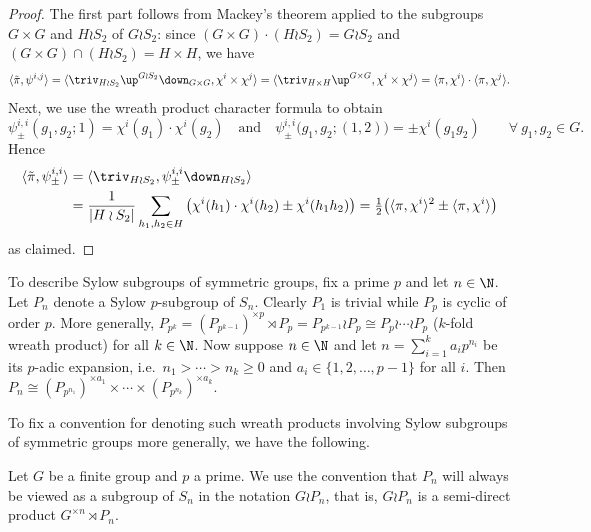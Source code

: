 \begin{proof}
	The first part follows from Mackey's theorem applied to the subgroups $G\times G$ and $H\wr S_2$ of $G\wr S_2$: since $(G\times G)\cdot (H\wr S_2)=G\wr S_2$ and $(G\times G)\cap (H\wr S_2)=H\times H$, we have
	\[ \langle\tilde{\pi},\psi^{i,j}\rangle	= \langle \triv_{H\wr S_2}\up^{G\wr S_2}\down_{G\times G}, \chi^i\times\chi^j\rangle = \langle \triv_{H\times H}\up^{G\times G}, \chi^i\times \chi^j\rangle = \langle\pi,\chi^i\rangle \cdot \langle\pi,\chi^j\rangle. \]
	Next, we use the wreath product character formula \cite[Lemma 4.3.9]{JK} to obtain
	\[ \psi^{i,i}_{\pm}(g_1,g_2;1) = \chi^i(g_1)\cdot\chi^i(g_2)\quad\text{and}\quad\psi^{i,i}_{\pm}\big(g_1,g_2;(1,2)\big) = \pm\chi^i(g_1 g_2) \qquad\forall\ g_1, g_2\in G. \]
	Hence
	\begin{align*}
		\langle\tilde{\pi},\psi^{i,i}_{\pm}\rangle &= \langle\triv_{H\wr S_2},\psi^{i,i}_{\pm}\down_{H\wr S_2}\rangle\\
		&= \frac{1}{|H\wr S_2|}\sum_{h_1,h_2\in H}\big(\chi^i(h_1)\cdot\chi^i(h_2)\pm\chi^i(h_1 h_2)\big) = \tfrac{1}{2}\big(\langle\pi,\chi^i\rangle^2\pm \langle\pi,\chi^i\rangle\big)
	\end{align*}
	as claimed.
\end{proof}

To describe Sylow subgroups of symmetric groups, fix a prime $p$ and let $n\in\N$. Let $P_n$ denote a Sylow $p$-subgroup of $S_n$. Clearly $P_1$ is trivial while $P_p$ is cyclic of order $p$. More generally, $P_{p^k}= (P_{p^{k-1}})^{\times p}\rtimes P_p=P_{p^{k-1}}\wr P_p\cong P_p\wr \cdots \wr P_p$ ($k$-fold wreath product) for all $k\in\N$. Now suppose $n\in\N$ and let $n=\sum_{i=1}^k a_ip^{n_i}$ be its $p$-adic expansion, i.e.~$n_1>\cdots>n_k\ge 0$ and $a_i\in\{1,2,\dotsc,p-1\}$ for all $i$. Then $P_n\cong (P_{p^{n_1}})^{\times a_1}\times\cdots\times (P_{p^{n_k}})^{\times a_k}$. 

To fix a convention for denoting such wreath products involving Sylow subgroups of symmetric groups more generally, we have the following.

\begin{notation}\label{not:convention}
	Let $G$ be a finite group and $p$ a prime. We use the convention that $P_n$ will always be viewed as a subgroup of $S_n$ in the notation $G\wr P_n$, that is, $G\wr P_n$ is a semi-direct product $G^{\times n}\rtimes P_n$. 
\end{notation}

